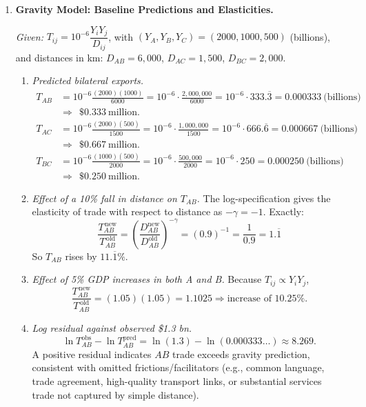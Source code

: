 \documentclass[11pt]{article}
\begin{document}
\begin{enumerate}[leftmargin=*, resume]
\item \textbf{Gravity Model: Baseline Predictions and Elasticities.}

\emph{Given:} $T_{ij}=10^{-6}\dfrac{Y_iY_j}{D_{ij}}$, with $(Y_A,Y_B,Y_C)=(2000,1000,500)$ (billions), and distances in km:
$D_{AB}=6{,}000$, $D_{AC}=1{,}500$, $D_{BC}=2{,}000$.

\begin{enumerate}
\item \emph{Predicted bilateral exports.}
\[
\begin{aligned}
T_{AB}&=10^{-6}\frac{(2000)(1000)}{6000}
=10^{-6}\cdot \frac{2{,}000{,}000}{6000}
=10^{-6}\cdot 333.\overline{3}
=0.000333\ \text{(billions)}\\
&\Rightarrow \ \ \$0.333\ \text{million.}\\[6pt]
T_{AC}&=10^{-6}\frac{(2000)(500)}{1500}
=10^{-6}\cdot \frac{1{,}000{,}000}{1500}
=10^{-6}\cdot 666.\overline{6}
=0.000667\ \text{(billions)}\\
&\Rightarrow \ \ \$0.667\ \text{million.}\\[6pt]
T_{BC}&=10^{-6}\frac{(1000)(500)}{2000}
=10^{-6}\cdot \frac{500{,}000}{2000}
=10^{-6}\cdot 250
=0.000250\ \text{(billions)}\\
&\Rightarrow \ \ \$0.250\ \text{million.}
\end{aligned}
\]

\item \emph{Effect of a 10\% fall in distance on $T_{AB}$.} The log-specification gives the elasticity of trade with respect to distance as $-\gamma=-1$. Exactly:
\[
\frac{T_{AB}^{\,\text{new}}}{T_{AB}^{\,\text{old}}}
=\left(\frac{D_{AB}^{\text{new}}}{D_{AB}^{\text{old}}}\right)^{-\gamma}
=(0.9)^{-1}=\frac{1}{0.9}=1.\overline{1}
\]
So $T_{AB}$ rises by $11.\overline{1}\%$.

\item \emph{Effect of 5\% GDP increases in both A and B.} Because $T_{ij}\propto Y_iY_j$,
\[
\frac{T_{AB}^{\,\text{new}}}{T_{AB}^{\,\text{old}}}=(1.05)(1.05)=1.1025 \Rightarrow \text{increase of } 10.25\%.
\]

\item \emph{Log residual against observed \$1.3 bn.} 
\[
\ln T^{\text{obs}}_{AB}-\ln T^{\text{pred}}_{AB}
=\ln(1.3)-\ln(0.000333\ldots)\approx 8.269.
\]
A positive residual indicates $AB$ trade exceeds gravity prediction, consistent with omitted frictions/facilitators (e.g., common language, trade agreement, high-quality transport links, or substantial services trade not captured by simple distance).
\end{enumerate}




\end{enumerate}
\end{document}
